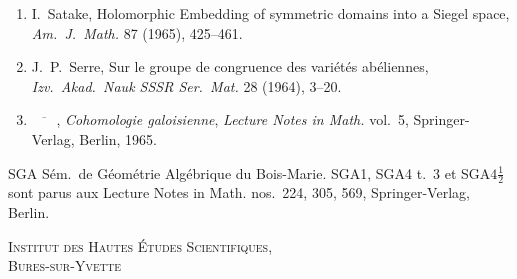 \documentclass[12pt,a4paper]{article}
\theoremstyle{plain}
\theoremstyle{definition}
\theoremstyle{remark}
\begin{document}
\begin{enumerate}[label=\arabic*., leftmargin=*]
\item I.~Satake, Holomorphic Embedding of symmetric domains into a Siegel space, \textit{Am.~J.~Math.} 87 (1965), 425--461.

\item J.~P.~Serre, Sur le groupe de congruence des vari\'et\'es ab\'eliennes, \textit{Izv.~Akad.~Nauk SSSR Ser.~Mat.} 28 (1964), 3--20.

\item $\overline{\phantom{mm}}$, \textit{Cohomologie galoisienne}, \textit{Lecture Notes in Math.} vol.~5, Springer-Verlag, Berlin, 1965.
\end{enumerate}

SGA S\'em.~de G\'eom\'etrie Alg\'ebrique du Bois-Marie. SGA1, SGA4 t.~3 et SGA$4\frac{1}{2}$ sont parus aux Lecture Notes in Math. nos.~224, 305, 569, Springer-Verlag, Berlin.

\vspace{1cm}
\begin{flushright}
\textsc{Institut des Hautes \'Etudes Scientifiques,}\\
\textsc{Bures-sur-Yvette}
\end{flushright}
\end{document}
